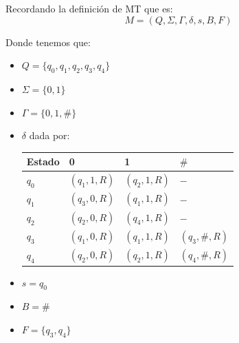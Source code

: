 \documentclass[11pt,letterpaper]{report}
\begin{document}
\begin{enumerate}
\begin{enumerate}
\begin{center}
            \end{center}
            
            Recordando la definición de MT que es:
            $$M = (Q, \Sigma, \Gamma, \delta, s, B, F)$$

            Donde tenemos que:
            \begin{itemize}
                \item $Q = \{ q_0, q_1, q_2, q_3, q_4\}$
                \item $\Sigma = \{ 0, 1 \}$
                \item $\Gamma = \{ 0, 1, \# \}$
                \item $\delta$ dada por:
                \begin{table}[H]
                    \centering
                    \begin{tabular}{|l|l|l|l|}
                    \hline
                    Estado & 0 & 1 & $\#$ \\ \hline
                    $q_0$ & $(q_1, 1, R)$ & $(q_2, 1, R)$ & $-$ \\ \hline
                    $q_1$ & $(q_3, 0, R)$ & $(q_1, 1, R)$ & $-$ \\ \hline
                    $q_2$ & $(q_2, 0, R)$ & $(q_4, 1, R)$ & $-$ \\ \hline
                    $q_3$ & $(q_1, 0, R)$ & $(q_1, 1, R)$ & $(q_3, \#, R)$ \\ \hline
                    $q_4$ & $(q_2, 0, R)$ & $(q_2, 1, R)$ & $(q_4, \#, R)$ \\ \hline
                    \end{tabular}
                \end{table}
                \item $s = q_0$
                \item $B = \#$
                \item $F = \{ q_3, q_4 \}$
            \end{itemize}


\end{enumerate}
\end{enumerate}
\end{document}
